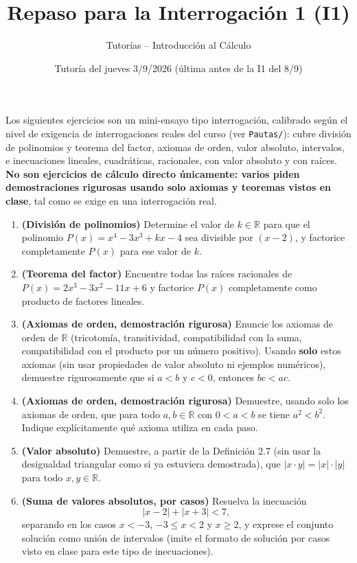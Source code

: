 \documentclass[11pt]{article}
\title{Repaso para la Interrogación 1 (I1)}
\author{Tutorías -- Introducción al Cálculo}
\date{Tutoría del jueves 3/9/2026 (última antes de la I1 del 8/9)}
\begin{document}
\maketitle

Los siguientes ejercicios son un mini-ensayo tipo interrogación, calibrado según el nivel de
exigencia de interrogaciones reales del curso (ver \texttt{Pautas/}): cubre división de polinomios
y teorema del factor, axiomas de orden, valor absoluto, intervalos, e inecuaciones lineales,
cuadráticas, racionales, con valor absoluto y con raíces. \textbf{No son ejercicios de cálculo
directo únicamente: varios piden demostraciones rigurosas usando solo axiomas y teoremas vistos en
clase}, tal como se exige en una interrogación real.

\begin{enumerate}
    \item \textbf{(División de polinomios)} Determine el valor de $k \in \mathbb{R}$ para que el
    polinomio $P(x) = x^4 - 3x^3 + kx - 4$ sea divisible por $(x-2)$, y factorice completamente
    $P(x)$ para ese valor de $k$.

    \item \textbf{(Teorema del factor)} Encuentre todas las raíces racionales de
    $P(x) = 2x^3 - 3x^2 - 11x + 6$ y factorice $P(x)$ completamente como producto de factores
    lineales.

    \item \textbf{(Axiomas de orden, demostración rigurosa)} Enuncie los axiomas de orden de
    $\mathbb{R}$ (tricotomía, transitividad, compatibilidad con la suma, compatibilidad con el
    producto por un número positivo). Usando \textbf{solo} estos axiomas (sin usar propiedades de
    valor absoluto ni ejemplos numéricos), demuestre rigurosamente que si $a<b$ y $c<0$, entonces
    $bc < ac$.

    \item \textbf{(Axiomas de orden, demostración rigurosa)} Demuestre, usando solo los axiomas de
    orden, que para todo $a,b\in\mathbb{R}$ con $0<a<b$ se tiene $a^2<b^2$. Indique explícitamente
    qué axioma utiliza en cada paso.

    \item \textbf{(Valor absoluto)} Demuestre, a partir de la Definición 2.7 (sin usar la
    desigualdad triangular como si ya estuviera demostrada), que $|x\cdot y| = |x|\cdot|y|$ para
    todo $x,y\in\mathbb{R}$.

    \item \textbf{(Suma de valores absolutos, por casos)} Resuelva la inecuación
    $$|x-2| + |x+3| < 7,$$
    separando en los casos $x<-3$, $-3\le x<2$ y $x\ge 2$, y exprese el conjunto solución como
    unión de intervalos (imite el formato de solución por casos visto en clase para este tipo de
    inecuaciones).


\end{enumerate}
\end{document}
